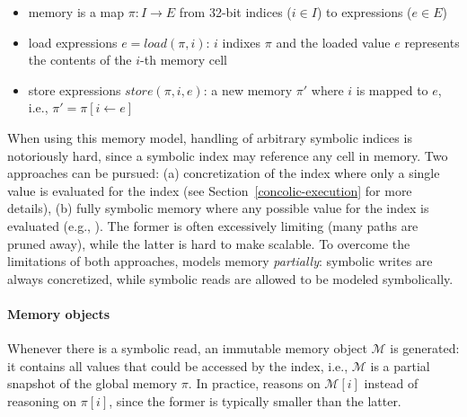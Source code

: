 \begin{itemize}
  \item memory is a map $\pi : I \to E$ from 32-bit indices ($i \in I$) to expressions ($e \in E$)
  \item load expressions $e = load(\pi, i)$: $i$ indixes $\pi$ and the loaded value $e$ represents the contents of the $i$-th memory cell
  \item store expressions $store(\pi, i, e)$: a new memory $\pi'$ where $i$ is mapped to $e$, i.e., $\pi' = \pi[i \gets e]$
\end{itemize}
When using this memory model, handling of arbitrary symbolic indices is notoriously hard, since a symbolic index may reference any cell in memory. Two approaches can be pursued: (a) concretization of the index where only a single value is evaluated for the index (see Section~\ref{concolic-execution} for more details), (b) fully symbolic memory where any possible value for the index is evaluated (e.g., \cite{BAP-CAV11}). The former is often excessively limiting (many paths are pruned away), while the latter is hard to make scalable. To overcome the limitations of both approaches, \cite{MAYHEM-SP12} models memory {\em partially}: symbolic writes are always concretized, while symbolic reads are allowed to be modeled symbolically.

\paragraph{Memory objects} Whenever there is a symbolic read, an immutable memory object $\mathcal{M}$ is generated:  it contains all values that could be accessed by the index, i.e., $\mathcal{M}$ is a partial snapshot of the global memory $\pi$. In practice, \cite{MAYHEM-SP12} reasons on $\mathcal{M}[i]$ instead of reasoning on $\pi[i]$, since the former is typically smaller than the latter.

